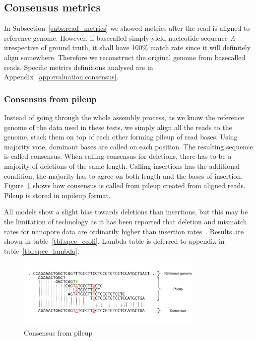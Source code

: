 \documentclass[runningheads,a4paper]{llncs}
\begin{document}
\subsection{Consensus metrics}

In Subsection~\ref{subs:read_metrics} we showed metrics after the read is aligned to reference genome. However, if basecalled simply yield nucleotide sequence \emph{A} irrespective of ground truth, it shall have 100\% match rate since it will definitely align somewhere. Therefore we reconstruct the original genome from basecalled reads. Specific metrics definitions analysed are in Appendix~\ref{app:evaluation:consensus}.

\subsubsection{Consensus from pileup}

Instead of going through the whole assembly process, as we know the reference genome of the data used in these tests, we simply align all the reads to the genome, stack them on top of each other forming pileup of read bases. Using majority vote, dominant bases are called on each position. The resulting sequence is called consensus. When calling consensus for deletions,  there has to be a majority of deletions of the same length. Calling insertions has the additional condition, the majority has to agree on both length and the bases of insertion. Figure~\ref{fg:consensus} shows how consensus is called from pileup created from aligned reads. Pileup is stored in mpileup format.

All models show a slight bias towards deletions than insertions, but this may be the limitation of technology as it has been reported that deletion and mismatch rates for nanopore data are ordinarily higher than insertion rates~\cite{sovic2016fast}. Results are shown in table~\ref{tbl:spec_ecoli}. Lambda table is deferred to appendix in table~\ref{tbl:spec_lambda}.

\begin{figure}[]
   \begin{center}
       \includegraphics[width=0.8\textwidth]{./imgs/consnesus.png}
       \caption{Consensus from pileup}
       \label{fg:consensus}
   \end{center}
\end{figure}
\end{document}
